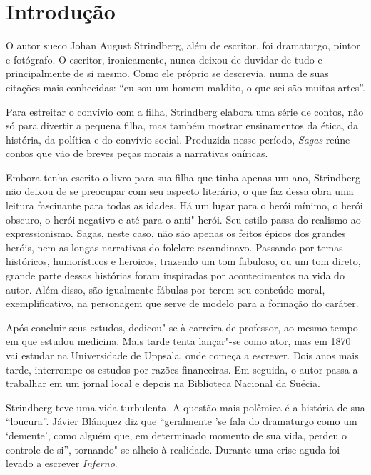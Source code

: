 \documentclass[12pt]{extarticle}
\begin{document}
\tableofcontents


\section{Introdução}

O autor sueco Johan August Strindberg, além de escritor, foi dramaturgo, pintor e fotógrafo.
O escritor, ironicamente, nunca deixou de duvidar de tudo e principalmente de si mesmo.
Como ele próprio se descrevia, numa de suas citações mais conhecidas: ``eu sou um homem maldito, o que sei são muitas artes''.


Para estreitar o convívio com a filha, Strindberg elabora uma série de contos, não só para divertir a pequena filha, mas também mostrar ensinamentos da ética, da história, da política e do convívio social. Produzida nesse período, \textit{Sagas} reúne contos que vão de breves peças morais a narrativas oníricas.

Embora tenha escrito o livro para sua filha que tinha apenas um ano, Strindberg não deixou de se preocupar com seu aspecto literário, o que faz dessa obra uma leitura fascinante para todas as idades.
Há um lugar para o herói mínimo, o herói obscuro, o herói negativo e até para o anti"-herói.
Seu estilo passa do realismo ao expressionismo. 
Sagas, neste caso, não são apenas os feitos épicos dos grandes heróis, nem as longas narrativas do folclore escandinavo.
Passando por temas históricos, humorísticos e heroicos, trazendo um tom fabuloso, ou um tom direto, grande parte dessas histórias foram inspiradas por acontecimentos na vida do autor.
Além disso, são igualmente fábulas por terem seu conteúdo moral, exemplificativo, na personagem que serve de modelo para a formação do caráter.


Após concluir seus estudos, dedicou"-se à carreira de professor, ao mesmo tempo em que estudou medicina.
Mais tarde tenta lançar"-se como ator, mas em 1870 vai estudar na Universidade de Uppsala, 
onde começa a escrever. Dois anos mais tarde, interrompe os estudos por razões financeiras.
Em seguida, o autor passa a trabalhar em um jornal local e depois na Biblioteca Nacional da Suécia.

Strindberg teve uma vida turbulenta. A questão mais polêmica é a história de sua ``loucura''. Jávier 
Blánquez diz que ``geralmente 'se fala do dramaturgo como um ‘demente’, como alguém que, em determinado momento de sua vida, perdeu o controle de si'', tornando"-se alheio à realidade. 
Durante uma crise aguda foi levado a escrever \textit{Inferno}.
\end{document}
